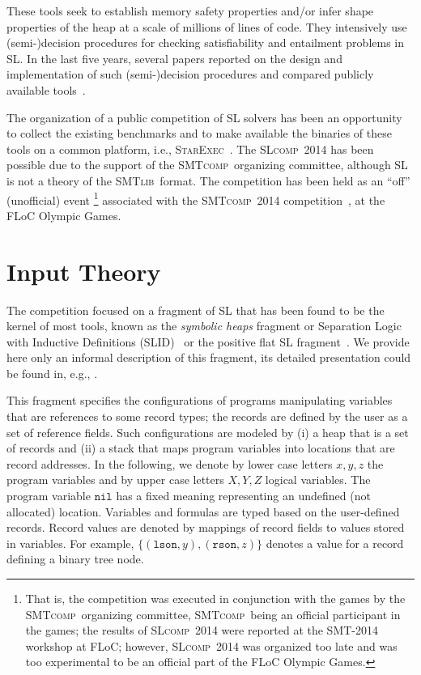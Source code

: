 \documentclass[twoside,11pt]{article}
\newcommand{\nil}{\mathtt{nil}}
\newcommand{\SLRD}{\textsc{SLID}}
\newcommand{\smtlib}{\textsc{SMTlib}}
\newcommand{\smtcomp}{\textsc{SMTcomp}}
\newcommand{\slcomp}{\textsc{SLcomp}}
\newcommand{\starexec}{\textsc{StarExec}}
\begin{document}
These tools seek to establish memory safety properties and/or infer shape properties of the heap at a scale of millions of lines of code.
They intensively use (semi-)decision procedures for checking satisfiability and entailment problems in SL.
In the last five years, several papers reported on the design and implementation of such (semi-)decision procedures and compared publicly available tools~\cite{HasseIOP13}.

The organization of a public competition of SL solvers has been an opportunity 
to collect the existing benchmarks and  
to make available the binaries of these tools on a common platform, i.e., \starexec~\cite{StarExecsite}.
The \slcomp\ 2014 has been possible due to the support of the \smtcomp\ organizing committee, 
although SL is not a theory of the \smtlib\ format.
The competition has been held as an ``off'' (unofficial) event \footnote{That is, the competition was executed in conjunction with the games by the \smtcomp\ organizing committee, \smtcomp\ being an official participant in the games; the results of \slcomp\ 2014 were reported at the SMT-2014 workshop at FLoC; however, \slcomp\ 2014 was organized too late and was too experimental to be an official part of the FLoC Olympic Games.}
associated with the \smtcomp\ 2014 competition~\cite{SMTCOMPsite}, at the FLoC Olympic Games.


\section{Input Theory}

The competition focused on a fragment of SL that has been found to be the kernel of most tools, known 
as
the \emph{symbolic heaps} fragment
or Separation Logic with Inductive Definitions (\SLRD)~\cite{IosifRS13} or
the positive flat SL fragment~\cite{AntonopoulosGHKO14}. 
We provide here only an informal description of this fragment, its detailed presentation could be found in, e.g., \cite{Reynolds02,IosifRS13,AntonopoulosGHKO14}.  

This fragment specifies the configurations of programs manipulating variables that are references to some record types; the records are defined by the user as a set of reference fields.
Such configurations are modeled by
(i) a heap that is a set of records and
(ii) a stack that maps program variables into locations that are record addresses.
%
In the following, we denote by lower case letters $x,y,z$ the program variables and by upper case letters $X,Y,Z$ logical variables. The program variable $\nil$ has a fixed meaning representing an undefined (not allocated) location.
%
Variables and formulas are typed based on the user-defined records. Record values are denoted by mappings of record fields to values stored in variables. For example, $\{(\texttt{lson},y), (\texttt{rson},z)\}$ denotes a value for a record defining a binary tree node.
\end{document}

